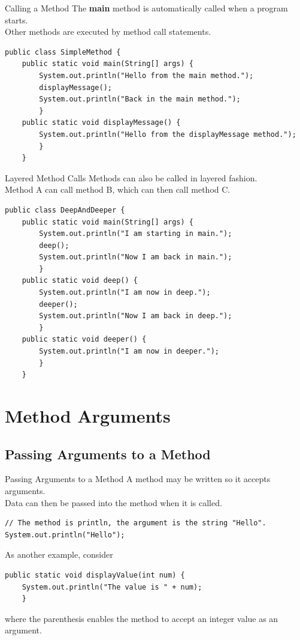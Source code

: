 \documentclass[11pt]{beamer}
\begin{document}
\begin{frame}[fragile]{Calling a Method}
    \vspace{1em} 
    The \textbf{main} method is automatically called when a program starts. \\ 
    \vspace{1em} 
    Other methods are executed by method call statements.
    \begin{lstlisting}
public class SimpleMethod { 
    public static void main(String[] args) {
        System.out.println("Hello from the main method.");
        displayMessage();
        System.out.println("Back in the main method.");
        }
    public static void displayMessage() {
        System.out.println("Hello from the displayMessage method."); 
        }
    }
    \end{lstlisting}
\end{frame}

\begin{frame}[fragile]{Layered Method Calls}
Methods can also be called in layered fashion. \\ 
\vspace{1em}
Method A can call method B, which can then call method C.
\begin{lstlisting}[basicstyle=\ttfamily\scriptsize]
public class DeepAndDeeper {
    public static void main(String[] args) {
        System.out.println("I am starting in main.");
        deep();
        System.out.println("Now I am back in main.");
        }
    public static void deep() {
        System.out.println("I am now in deep.");
        deeper();
        System.out.println("Now I am back in deep.");
        }
    public static void deeper() {
        System.out.println("I am now in deeper.");
        }
    }
\end{lstlisting}
\end{frame}

\section{Method Arguments}
\subsection{Passing Arguments to a Method}
\begin{frame}[fragile]{Passing Arguments to a Method}
A method may be written so it accepts arguments. \\ 
\vspace{1em} 
Data can then be passed into the method when it is called.
\begin{lstlisting}
// The method is println, the argument is the string "Hello".
System.out.println("Hello");
\end{lstlisting}
As another example, consider
\begin{lstlisting}
public static void displayValue(int num) {
    System.out.println("The value is " + num); 
    }
\end{lstlisting}
where the parenthesis enables the method to accept an integer value as an argument.
\end{frame}
\end{document}

